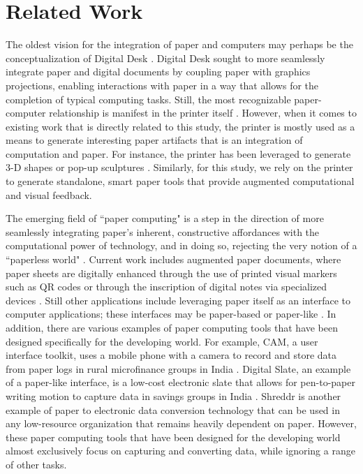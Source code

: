 \documentclass{sig-alternate}
\begin{document}


\section{Related Work}
The oldest vision for the integration of paper and computers may perhaps be the conceptualization of Digital Desk \cite{wellner1993}. Digital Desk sought to more seamlessly integrate paper and digital documents by coupling paper with graphics projections, enabling interactions with paper in a way that allows for the completion of typical computing tasks. Still, the most recognizable paper-computer relationship is manifest in the printer itself \cite{qi2010}. However, when it comes to existing work that is directly related to this study, the printer is mostly used as a means to generate interesting paper artifacts that is an integration of computation and paper. For instance, the printer has been leveraged to generate 3-D shapes or pop-up sculptures \cite{eisenberg1997, hendrix2005}. Similarly, for this study, we rely on the printer to generate standalone, smart paper tools that provide augmented computational and visual feedback.

The emerging field of ``paper computing" is a step in the direction of more seamlessly integrating paper's inherent, constructive affordances with the computational power of technology, and in doing so, rejecting the very notion of a ``paperless world" \cite{kaplan2010}. Current work includes augmented paper documents, where paper sheets are digitally enhanced through the use of printed visual markers such as QR codes \cite{kaplan2010} or through the inscription of digital notes via specialized devices \cite{anoto, pietrzak2010}. Still other applications include leveraging paper itself as an interface to computer applications; these interfaces may be paper-based \cite{bonnard2010, portocarrero2010} or paper-like \cite{qi2010, coelho2009}. In addition, there are various examples of paper computing tools that have been designed specifically for the developing world. For example, CAM, a user interface toolkit, uses a mobile phone with a camera to record and store data from paper logs in rural microfinance groups in India \cite{parikh2006}. Digital Slate, an example of a paper-like interface, is a low-cost electronic slate that allows for pen-to-paper writing motion to capture data in savings groups in India \cite{ratan2010}. Shreddr is another example of paper to electronic data conversion technology that can be used in any low-resource organization that remains heavily dependent on paper\cite{chen2012}. However, these paper computing tools that have been designed for the developing world almost exclusively focus on capturing and converting data, while ignoring a range of other tasks.
\end{document}
